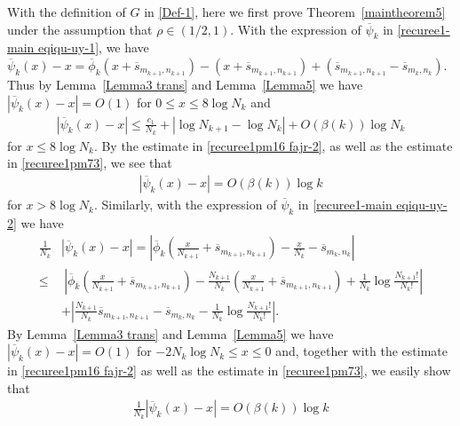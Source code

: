 \documentclass[12pt]{amsart}
\numberwithin{equation}{section}
\begin{document}
With the definition of $G$ in \eqref{Def-1}, here we first prove Theorem~\ref{maintheorem5} under the assumption that $\rho\in(1/2,1)$. With the expression of $\overline{\psi}_k$ in \eqref{recuree1-main eqiqu-uy-1}, we have $\overline{\psi}_{k}(x)-x=\overline{\phi}_{k}(x+\overline{s}_{m_{k+1},n_{k+1}})-(x+\overline{s}_{m_{k+1},n_{k+1}})+(\overline{s}_{m_{k+1},n_{k+1}}-\overline{s}_{m_k,n_k})$. Thus by Lemma~\ref{Lemma3 trans} and Lemma~\ref{Lemma5} we have $|\overline{\psi}_{k}(x)-x|=O(1)$ for $0\leq x\leq 8\log N_k$ and
\begin{equation*}%
\begin{split}
|\overline{\psi}_{k}(x)-x|\leq \frac{c_1}{N_k}+|\log N_{k+1}-\log N_k|+O(\beta(k))\log N_k
\end{split}
\end{equation*}
for $x\leq 8\log N_k$. By the estimate in \eqref{recuree1pm16  fajr-2}, as well as the estimate in \eqref{recuree1pm73}, we see that
\begin{equation}\label{recuree1pm95-poi-1}
\begin{split}
|\overline{\psi}_{k}(x)-x|=O(\beta(k))\log k
\end{split}
\end{equation}
for $x>8\log N_k$. Similarly, with the expression of $\overline{\psi}_k$ in \eqref{recuree1-main eqiqu-uy-2} we have
\begin{equation*}%
\begin{split}
\frac{1}{N_k}&\left|\overline{\psi}_k(x)-x\right|
=\left|\overline{\phi}_k\left(\frac{x}{N_{k+1}}+\overline{s}_{m_{k+1},n_{k+1}}\right)-\frac{x}{N_{k}}-\overline{s}_{m_{k},n_{k}}\right|\\
\leq &\ \left|\overline{\phi}_k\left(\frac{x}{N_{k+1}}+\overline{s}_{m_{k+1},n_{k+1}}\right)-\frac{N_{k+1}}{N_{k}}\left(\frac{x}{N_{k+1}}+\overline{s}_{m_{k+1},n_{k+1}}\right)+\frac{1}{N_k}\log\frac{N_{k+1}!}{N_k!}\right|\\
&+\left|\frac{N_{k+1}}{N_{k}}\overline{s}_{m_{k+1},n_{k+1}}-\overline{s}_{m_{k},n_{k}}-\frac{1}{N_k}\log\frac{N_{k+1}!}{N_k!}\right|.
\end{split}
\end{equation*}
By Lemma~\ref{Lemma3 trans} and Lemma~\ref{Lemma5} we have $|\overline{\psi}_{k}(x)-x|=O(1)$ for $-2N_k\log N_k\leq x\leq 0$ and, together with the estimate in \eqref{recuree1pm16  fajr-2} as well as the estimate in \eqref{recuree1pm73}, we easily show that
\begin{equation}\label{recuree1pm95-poi-2}
\begin{split}
\frac{1}{N_k}|\overline{\psi}_k(x)-x|=O(\beta(k))\log k
\end{split}
\end{equation}
\end{document}
